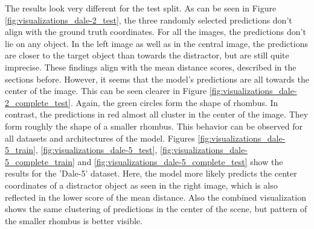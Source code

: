 The results look very different for the test split.
As can be seen in Figure \ref{fig:visualizations_dale-2_test}, the three randomly selected predictions don't align with the ground truth coordinates.
For all the images, the predictions don't lie on any object.
In the left image as well as in the central image, the predictions are closer to the target object than towards the distractor, but are still quite imprecise.
These findings align with the mean distance scores, described in the sections before.
However, it seems that the model's predictions are all towards the center of the image.
This can be seen clearer in Figure \ref{fig:visualizations_dale-2_complete_test}.
Again, the green circles form the shape of rhombus.
In contrast, the predictions in red almost all cluster in the center of the image.
They form roughly the shape of a smaller rhombus.
This behavior can be observed for all datasets and architectures of the model.
Figures \ref{fig:visualizations_dale-5_train}, \ref{fig:visualizations_dale-5_test}, \ref{fig:visualizations_dale-5_complete_train} and \ref{fig:visualizations_dale-5_complete_test} show the results for the 'Dale-5' dataset.
Here, the model more likely predicts the center coordinates of a distractor object as seen in the right image, which is also reflected in the lower score of the mean distance.
Also the combined visualization shows the same clustering of predictions in the center of the scene, but pattern of the smaller rhombus is better visible.

